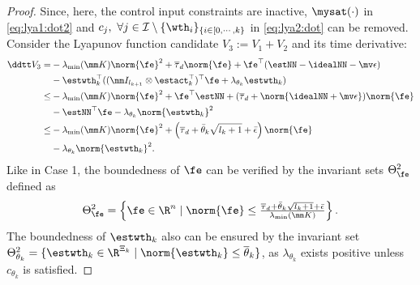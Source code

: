 \documentclass[lettersize,journal]{IEEEtran}
\begin{document}
\begin{proof}
Since, here, the control input constraints are inactive, $\mysat(\cdot)$ in \eqref{eq:lya1:dot2} and $c_j,\ \forall j\in\mathcal I \setminus \{\wth_i\}_{\{i\in[0,\cdots,k\}}$ in \eqref{eq:lya2:dot} can be removed.
Consider the Lyapunov function candidate $V_3:=V_1+V_2$ and its time derivative:
\begin{equation}
    \begin{aligned}
        \ddtt V_3
        =&
        -\lambda_{\min}(\mm K)\norm{\fe}^2
        +\overline\tau_d\norm{\fe}
        +\fe^\top (\estNN - \idealNN - \mv\epsilon)
        \\
        &
        -\estwth_k^\top (
            (\mm I_{l_{k+1}}\otimes \estact_k^\top)^\top
            \fe
            +
            \lambda_{\theta_k}\estwth_k
        )
        \\
        \le&
        -\lambda_{\min}(\mm K)\norm{\fe}^2
        +\fe^\top \estNN
        +(
            \overline\tau_d+\norm{
                \idealNN+\mv\epsilon
            }
        )
        \norm{\fe}
        \\
        &
        -\estNN^\top\fe 
        -\lambda_{\theta_k}\norm{\estwth_k}^2
        \\
        \le&
        -
        \lambda_{\min}(\mm K)
        \norm{\fe}^2
        +
        \left(
            \overline\tau_d
            +
            \bar{\theta}_k\sqrt{l_{k}+1}
            +
            \bar{\epsilon}
        \right)
        \norm{\fe}
        \\
        &
        -
        \lambda_{\theta_k}\norm{\estwth_k}^2
        .
    \end{aligned}
    \label{eq:lya3:dot}
\end{equation}
Like in Case 1, the boundedness of $\fe$ can be verified by the invariant sets $\Theta_{\fe}^{2}$ defined as
\begin{equation}
    \Theta_{\fe}^{2}
    =
    \left\{ 
        \fe \in \R^n 
        \mid 
        \norm{\fe} 
        \le 
        \tfrac{
            \overline\tau_d
            +
            \bar{\theta}_k\sqrt{l_{k}+1}
            +
            \bar{\epsilon}
        }{
            \lambda_{\min}(\mm K)
        }
    \right\}
    .
\end{equation}
The boundedness of $\estwth_k$ also can be ensured by the invariant set $\Theta_{\theta_k}^{2}=\{ \estwth_k \in \R^{\Xi_{k}} \mid \norm{\estwth_k} \le \overline\theta_k \}$, as $\lambda_{\theta_k}$ exists positive unless $c_{\theta_k}$ is satisfied.

\hfill 


\end{proof}
\end{document}
